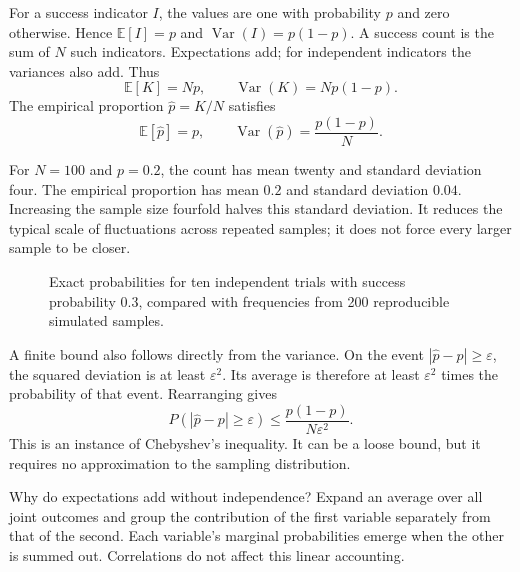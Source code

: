 \documentclass[11pt,oneside,openany]{book}
\theoremstyle{definition}
\theoremstyle{remark}
\numberwithin{equation}{chapter}
\begin{document}
For a success indicator \(I\), the values are one with probability \(p\) and zero otherwise. Hence \(\mathbb E[I]=p\) and \(\operatorname{Var}(I)=p(1-p)\). A success count is the sum of \(N\) such indicators. Expectations add; for independent indicators the variances also add. Thus \[\mathbb E[K]=Np,\qquad \operatorname{Var}(K)=Np(1-p).\] The empirical proportion \(\widehat p=K/N\) satisfies \[\mathbb E[\widehat p]=p,\qquad
\operatorname{Var}(\widehat p)=\frac{p(1-p)}N.\]

For \(N=100\) and \(p=0.2\), the count has mean twenty and standard deviation four. The empirical proportion has mean \(0.2\) and standard deviation \(0.04\). Increasing the sample size fourfold halves this standard deviation. It reduces the typical scale of fluctuations across repeated samples; it does not force every larger sample to be closer.

\begin{figure}[htbp]\centering
{}
\caption{Exact probabilities for ten independent trials with success probability 0.3, compared with frequencies from 200 reproducible simulated samples.}\end{figure}

A finite bound also follows directly from the variance. On the event \(|\widehat p-p|\geq\varepsilon\), the squared deviation is at least \(\varepsilon^2\). Its average is therefore at least \(\varepsilon^2\) times the probability of that event. Rearranging gives \[P(|\widehat p-p|\geq\varepsilon)
\leq\frac{p(1-p)}{N\varepsilon^2}.\] This is an instance of Chebyshev's inequality. It can be a loose bound, but it requires no approximation to the sampling distribution.

Why do expectations add without independence? Expand an average over all joint outcomes and group the contribution of the first variable separately from that of the second. Each variable's marginal probabilities emerge when the other is summed out. Correlations do not affect this linear accounting.
\end{document}
